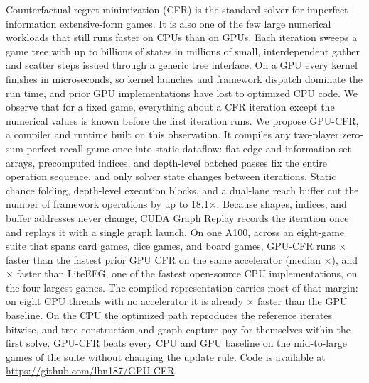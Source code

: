 Counterfactual regret minimization (CFR) is the standard solver for imperfect-information
extensive-form games. It is also one of the few large numerical
workloads that still runs faster on CPUs than on GPUs. Each iteration sweeps a game
tree with up to billions of states in millions of small, interdependent gather and
scatter steps issued through a generic tree interface. On a GPU every kernel finishes
in microseconds, so kernel launches and framework dispatch dominate the run time, and
prior GPU implementations have lost to optimized CPU code. We observe that for a fixed
game, everything about a CFR iteration except the numerical values is known before the
first iteration runs. We propose GPU-CFR, a compiler and runtime built on this
observation. It compiles any two-player zero-sum perfect-recall game once into static dataflow: flat
edge and information-set arrays, precomputed indices, and depth-level batched passes
fix the entire operation sequence, and only solver state changes between iterations.
Static chance folding, depth-level execution blocks, and a dual-lane reach buffer cut
the number of framework operations by up to 18.1$\times$. Because shapes, indices, and
buffer addresses never change, CUDA Graph Replay records the iteration once and
replays it with a single graph launch. On one A100, across an eight-game suite that
spans card games, dice games, and board games, GPU-CFR runs \kimGraphRange$\times$
faster than the fastest prior GPU CFR on the same accelerator (median
\kimGraphMedian$\times$), and \liteGraphLargestRange$\times$ faster than LiteEFG, one of the
fastest open-source CPU implementations, on the four largest games. The compiled
representation carries most of that margin: on eight CPU threads with no accelerator
it is already \kimCpuRange$\times$ faster than the GPU baseline. On the CPU the
optimized path reproduces the reference iterates bitwise, and tree construction and
graph capture pay for themselves within the first solve. GPU-CFR beats every CPU and
GPU baseline on the mid-to-large games of the suite without changing the update rule.
Code is available at \url{https://github.com/lbn187/GPU-CFR}.
